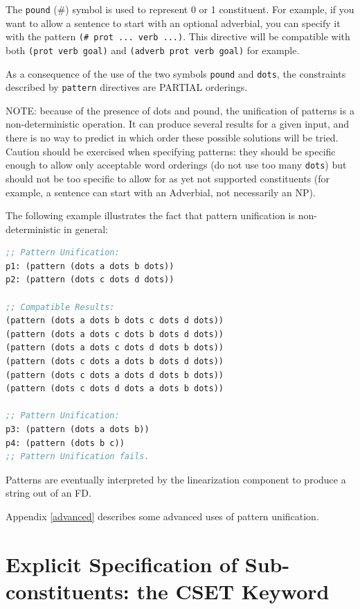 \documentclass[10pt,a4paper]{report}
\begin{document}
The {\tt pound} (\#) symbol is used to represent 0 or 1 constituent.
For example, if you want to allow a sentence to start with an
optional adverbial, you can specify it with the pattern {\tt (\# prot
... verb ...)}. This directive will be compatible with both {\tt (prot
verb goal)} and {\tt (adverb prot verb goal)} for example.

As a consequence of the use of the two symbols {\tt pound} and
{\tt dots}, the constraints described by {\tt pattern} directives are PARTIAL
orderings. 

NOTE: because of the presence of dots and pound, the unification of
patterns is a non-deterministic operation. It can produce several results
for a given input, and there is no way to predict in which order these
possible solutions will be tried. Caution should be exercised when
specifying patterns: they should be specific enough to allow only
acceptable word orderings (do not use too many {\tt dots}) but should not be
too specific to allow for as yet not supported constituents (for example, a
sentence can start with an Adverbial, not necessarily an NP).

The following example illustrates the fact that pattern unification is
non-deterministic in general:

\begin{lstlisting}[language=Lisp]
;; Pattern Unification:
p1: (pattern (dots a dots b dots))
p2: (pattern (dots c dots d dots))

;; Compatible Results:
(pattern (dots a dots b dots c dots d dots))
(pattern (dots a dots c dots b dots d dots))
(pattern (dots a dots c dots d dots b dots))
(pattern (dots c dots a dots b dots d dots))
(pattern (dots c dots a dots d dots b dots))
(pattern (dots c dots d dots a dots b dots))

;; Pattern Unification:
p3: (pattern (dots a dots b))
p4: (pattern (dots b c))
;; Pattern Unification fails.
\end{lstlisting}

Patterns are eventually interpreted by the linearization component to
produce a string out of an FD.

Appendix \ref{advanced} describes some advanced uses of pattern unification.


\section{Explicit Specification of Sub-constituents: the CSET Keyword}
\label{cset-expansion}
\end{document}
